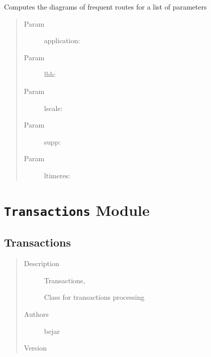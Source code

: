 \documentclass[letterpaper,10pt,english]{sphinxmanual}
\begin{document}

\begin{fulllineitems}
\label{index:SuperHub.Routes.transaction_routes_many}
Computes the diagrams of frequent routes for a list of parameters
\begin{quote}\begin{description}
\item[{Param }] \leavevmode
application:

\item[{Param }] \leavevmode
lhh:

\item[{Param }] \leavevmode
lscale:

\item[{Param }] \leavevmode
supp:

\item[{Param }] \leavevmode
ltimeres:

\end{description}\end{quote}

\end{fulllineitems}



\chapter{\texttt{Transactions} Module}
\label{index:module-SuperHub.Transactions}\label{index:transactions-module}\label{index:module-Transactions}

\section{Transactions}
\label{index:transactions}\begin{quote}\begin{description}
\item[{Description}] \leavevmode
Transactions,

Class for transactions processing

\item[{Authors}] \leavevmode
bejar

\item[{Version}] 

\end{description}\end{quote}
\end{document}
